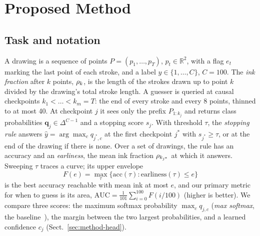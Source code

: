 \section{Proposed Method}
\label{sec:method}

\subsection{Task and notation}
A drawing is a sequence of points $P = (p_1,\dots,p_T)$, $p_t \in \mathbb{R}^2$, with a flag
$e_t$ marking the last point of each stroke, and a label $y \in \{1,\dots,C\}$, $C = 100$. The
\emph{ink fraction} after $k$ points, $\rho_k$, is the length of the strokes drawn up to point $k$
divided by the drawing's total stroke length. A guesser is queried at causal checkpoints
$k_1 < \dots < k_m = T$: the end of every stroke and every 8 points, thinned to at most 40. At
checkpoint $j$ it sees only the prefix $P_{1:k_j}$ and returns class probabilities
$\mathbf{q}_j \in \Delta^{C-1}$ and a stopping score $s_j$. With threshold $\tau$, the
\emph{stopping rule} answers $\hat y = \arg\max_c q_{j^\ast,c}$ at the first checkpoint
$j^\ast$ with $s_{j^\ast} \ge \tau$, or at the end of the drawing if there is none. Over a set of
drawings, the rule has an accuracy and an \emph{earliness}, the mean ink fraction
$\rho_{k_{j^\ast}}$ at which it answers. Sweeping $\tau$ traces a curve; its upper envelope
\begin{equation}
F(e) = \max_{\tau}\{\mathrm{acc}(\tau) : \mathrm{earliness}(\tau) \le e\}
\end{equation}
is the best accuracy reachable with mean ink at most $e$, and our primary metric for when to
guess is its area, $\mathrm{AUC} = \frac{1}{101}\sum_{i=0}^{100} F(i/100)$ (higher is better).
We compare three scores: the maximum softmax probability $\max_c q_{j,c}$
(\emph{max softmax}, the baseline~\cite{hendrycks2017baseline}), the margin between the two
largest probabilities, and a learned confidence $c_j$ (Sect.~\ref{sec:method-head}).

